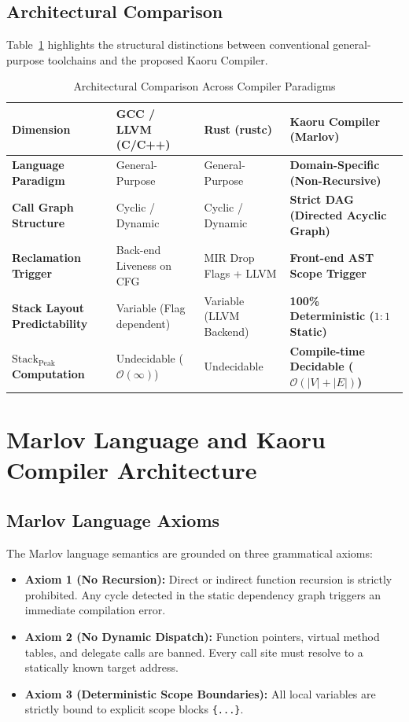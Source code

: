 \documentclass[conference]{IEEEtran}
\begin{document}
\subsection{Architectural Comparison}
Table~\ref{tab:comparison} highlights the structural distinctions between conventional general-purpose toolchains and the proposed Kaoru Compiler.

\begin{table}[htbp]
\caption{Architectural Comparison Across Compiler Paradigms}
\label{tab:comparison}
\centering
\small
\begin{tabular}{llll}
\toprule
\textbf{Dimension} & \textbf{GCC / LLVM (C/C++)} & \textbf{Rust (rustc)} & \textbf{Kaoru Compiler (Marlov)} \\
\midrule
\textbf{Language Paradigm} & General-Purpose & General-Purpose & \textbf{Domain-Specific (Non-Recursive)} \\
\textbf{Call Graph Structure} & Cyclic / Dynamic & Cyclic / Dynamic & \textbf{Strict DAG (Directed Acyclic Graph)} \\
\textbf{Reclamation Trigger} & Back-end Liveness on CFG & MIR Drop Flags + LLVM & \textbf{Front-end AST Scope Trigger} \\
\textbf{Stack Layout Predictability} & Variable (Flag dependent) & Variable (LLVM Backend) & \textbf{100\% Deterministic ($1:1$ Static)} \\
\textbf{$\mathrm{Stack}_{\mathrm{Peak}}$ Computation} & Undecidable ($\mathcal{O}(\infty)$) & Undecidable & \textbf{Compile-time Decidable ($\mathcal{O}(|V| + |E|)$)} \\
\bottomrule
\end{tabular}
\end{table}

\section{Marlov Language and Kaoru Compiler Architecture}

\subsection{Marlov Language Axioms}
The Marlov language semantics are grounded on three grammatical axioms:
\begin{itemize}
    \item \textbf{Axiom 1 (No Recursion):} Direct or indirect function recursion is strictly prohibited. Any cycle detected in the static dependency graph triggers an immediate compilation error.
    \item \textbf{Axiom 2 (No Dynamic Dispatch):} Function pointers, virtual method tables, and delegate calls are banned. Every call site must resolve to a statically known target address.
    \item \textbf{Axiom 3 (Deterministic Scope Boundaries):} All local variables are strictly bound to explicit scope blocks \texttt{\{...\}}.
\end{itemize}
\end{document}
